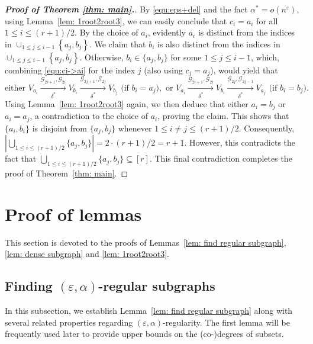\documentclass[11pt]{article}
\begin{document}
\begin{proof}[\bf Proof of Theorem \ref{thm: main}.]
By \eqref{equ:eps+del} and the fact $\alpha^*=o\left(n^{\varepsilon}\right)$, using Lemma~\ref{lem: 1root2root3},
we can easily conclude that $c_i=a_i$ for all $1\leq i\leq (r+1)/2$.
By the choice of $a_i$, evidently $a_i$ is distinct from the indices in $\cup_{1\leq j\leq i-1} \left\{a_j,b_j\right\}$.
We claim that $b_i$ is also distinct from the indices in $\cup_{1\leq j\leq i-1} \left\{a_j,b_j\right\}$.
Otherwise, $b_i\in \{a_j,b_j\}$ for some $1\leq j\leq i-1$, which, combining \eqref{equ:ci->ai} for the index $j$ (also using $c_j=a_j$),
would yield that
$$\mbox{either } V_{a_i} \xrightarrow[\delta^*]{\mathcal G_{2i+1}, \mathcal G_{2i} } V_{b_i}\xrightarrow[\delta^*]{\mathcal G_{2j+1}, \mathcal G_{2j} } V_{b_j} \mbox{ (if } b_i=a_j), \mbox{ or } V_{a_i} \xrightarrow[\delta^*]{\mathcal G_{2i+1}, \mathcal G_{2i} } V_{b_i}\xrightarrow[\delta^*]{\mathcal G_{2j}, \mathcal G_{2j-1} } V_{a_j}\mbox{ (if } b_i=b_j).$$
Using Lemma~\ref{lem: 1root2root3} again, we then deduce that either $a_i=b_j$ or $a_i=a_j$, a contradiction to the choice of $a_i$, proving the claim.
This shows that $\{a_i,b_i\}$ is disjoint from $\{a_j,b_j\}$ whenever $1\leq i\neq j\leq (r+1)/2$.
Consequently, $|\bigcup_{1\leq i\leq (r+1)/2} \{a_j,b_j\}|=2\cdot (r+1)/2=r+1$.
However, this contradicts the fact that $\bigcup_{1\leq i\leq (r+1)/2} \{a_j,b_j\}\subseteq [r]$.
This final contradiction completes the proof of Theorem~\ref{thm: main}.
\end{proof}


\section{Proof of lemmas}
This section is devoted to the proofs of Lemmas~\ref{lem: find regular subgraph},  \ref{lem: dense subgraph} and \ref{lem: 1root2root3}.

\subsection{Finding $(\varepsilon,\alpha)$-regular subgraphs}
In this subsection, we establish Lemma~\ref{lem: find regular subgraph} along with several related properties regarding $(\varepsilon,\alpha)$-regularity.
The first lemma will be frequently used later to provide upper bounds on the (co-)degrees of subsets.
\end{document}
